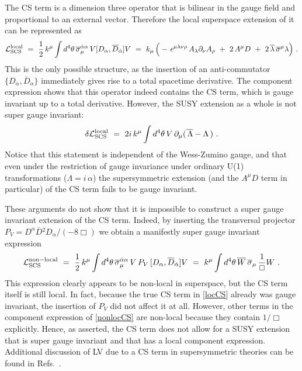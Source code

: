 \documentclass[12pt]{revtex4}
\begin{document}
The CS term is a dimension three operator that is bilinear in the
gauge field and proportional to an external vector. Therefore the
local superspace extension of it can be represented as 
%
\begin{equation}
{\cal L}_{\rm SCS}^{\rm local} ~=~ 
\frac 12 \, k^\mu \int d^4 \theta \, 
 \overline{\sigma}^{\dot{\alpha} \alpha}_\mu\, 
V [ D_\alpha, \overline{D}_{\dot\alpha}] V 
~=~
k_\mu \, \Big( 
- \,\epsilon^{\mu\lambda\nu\rho} \, 
A_\lambda \partial_\nu A_\rho
~+~ 
2\,  A^\mu D
~+~
2\, \overline{\lambda}\,\overline{\sigma}^\mu \lambda
\Big)~. 
\label{locCS}
\end{equation} 
%
This is the only possible structure, as the insertion of an
anti-commutator  $\{D_\alpha, \overline{D}_{\dot\alpha}\}$ immediately
gives rise to a total spacetime derivative. The component expression 
shows that this operator indeed contains the CS term, which 
is gauge invariant up to a total derivative. However, the
SUSY extension as a whole is not super gauge invariant: 
%
\begin{equation}
\delta {\cal L}_{\rm SCS}^{\rm local} 
~=~ 2 i\, k^\mu 
\int d^4 \theta \, 
V\, \partial_\mu ( \overline{\, \Lambda} - \Lambda \,)~. 
\label{locCStrans} 
\end{equation} 
%
Notice that this statement is independent of the Wess-Zumino
gauge, and that even under the restriction of  gauge invariance
under ordinary U(1) transformations ($\Lambda = i \,\alpha$) the
supersymmetric extension (and the $A^\mu D$ term in particular)  of
the CS term fails to be gauge invariant.  



These arguments do not show that it is impossible to construct a super
gauge invariant extension of the CS term. Indeed, by inserting the
transversal projector 
$P_V = D^\alpha \overline{D}{}^2 D_\alpha/(-8 \Box)$
we obtain a manifestly super gauge invariant expression 
%
\begin{equation}
\label{nonlocCS}
{\cal L}_{\rm SCS}^{\rm non-local} ~=~ 
\frac 12 \, k^\mu \int d^4 \theta \, 
 \overline{\sigma}^{\dot{\alpha} \alpha}_\mu\, 
V\, P_V\,  [ D_\alpha, \overline{D}_{\dot\alpha}] V
~=~
k^\mu \int d^4 \theta \, 
\overline{W} \, \overline{\sigma}_\mu \, \frac 1{\Box} W
~.
\end{equation} 
%
This expression clearly appears to be non-local in superspace, but
the CS term itself is still local. In fact, because the true CS term
in \eqref{locCS} already was gauge invariant, the insertion of $P_V$
did not affect it  at all. However, other terms in the component
expression of \eqref{nonlocCS} are non-local because they contain
$1/\Box$ explicitly.  Hence, as asserted, the CS term does not allow
for a SUSY extension that is super gauge invariant and that has a
local component expression.  Additional discussion of LV due to a CS
term in supersymmetric theories  
can be found in Refs.~\cite{Belich:,Belich:2005js}.
\end{document}
